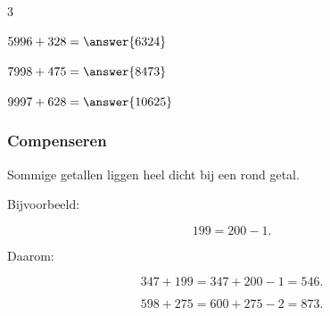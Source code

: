 \documentclass{ximera}
\begin{document}
\begin{oefening}{\oefB\ESS}
\begin{multicols}{3}
    \begin{question} \(5996+328=\answer{6324}\) \end{question}
    
    \begin{question} \(7998+475=\answer{8473}\) \end{question}
    
    \begin{question} \(9997+628=\answer{10625}\) \end{question}
    
    \end{multicols}
    
    \end{oefening}



\subsubsection*{Compenseren}

Sommige getallen liggen heel dicht bij een rond getal.

Bijvoorbeeld:

\[
199=200-1.
\]

Daarom:

\[
347+199
=
347+200-1
=
546.
\]


\begin{voorbeeld}

\[
598+275
=
600+275-2
=
873.
\]

\end{voorbeeld}
\end{document}
